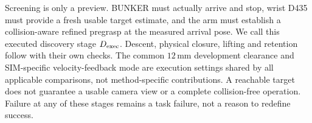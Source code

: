 Screening is only a preview. BUNKER must actually arrive and stop, wrist D435
must provide a fresh usable target estimate, and the arm must establish a
collision-aware refined pregrasp at the measured arrival pose. We call this
executed discovery stage $D_{\mathrm{exec}}$. Descent, physical closure, lifting and
retention follow with their own checks. The common $12\,\mathrm{mm}$ development
clearance and SIM-specific velocity-feedback mode are execution settings shared
by all applicable comparisons, not method-specific contributions. A reachable
target does not guarantee a usable camera view or a complete collision-free
operation. Failure at any of these stages remains a task failure, not a reason
to redefine success.
